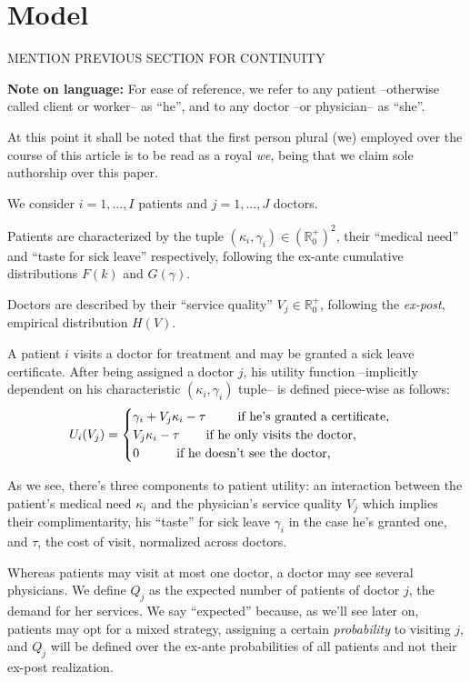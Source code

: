 \documentclass[../main.tex]{subfiles}
\begin{document}
\section{Model}

MENTION PREVIOUS SECTION FOR CONTINUITY

\textbf{Note on language:} For ease of reference, we refer to any patient --otherwise called client or worker-- as ``he'', and to any doctor --or physician-- as ``she''.

At this point it shall be noted that the first person plural (we) employed over the course of this article is to be read as a royal \textit{we}, being that we claim sole authorship over this paper.

We consider $i = 1, ..., I$ patients and $j = 1, ..., J$ doctors.

Patients are characterized by the tuple $(\kappa_i,\gamma_i) \in (\mathbb{R}_0^+)^2$, their ``medical need'' and ``taste for sick leave'' respectively, following the ex-ante cumulative distributions $F(k)$ and $G(\gamma)$.

Doctors are described by their ``service quality'' $V_j \in \mathbb{R}_0^+$, following the \textit{ex-post}, empirical distribution $H(V)$.

A patient $i$ visits a doctor for treatment and may be granted a sick leave certificate. After being assigned a doctor $j$, his utility function --implicitly dependent on his characteristic $(\kappa_i,\gamma_i)$ tuple-- is defined piece-wise as follows:
    \[
U_i(V_j) =\begin{cases}
\gamma_i + V_j \kappa_i - \tau \text{  \hspace{0.65cm} if he’s granted a certificate,} \\
V_j \kappa_i - \tau \text{  \hspace{0.5cm} if he only visits the doctor,} \\
0 \text{  \hspace{0.8cm} if he doesn't see the doctor,}
\end{cases}
\]

As we see, there's three components to patient utility: an interaction between the patient's medical need $\kappa_i$ and the physician's service quality $V_j$ which implies their complimentarity, his ``taste'' for sick leave $\gamma_i$ in the case he's granted one, and $\tau$, the cost of visit, normalized across doctors.

Whereas patients may visit at most one doctor, a doctor may see several physicians. We define $Q_j$ as the expected number of patients of doctor $j$, the demand for her services. We say ``expected'' because, as we'll see later on, patients may opt for a mixed strategy, assigning a certain \textit{probability} to visiting $j$, and $Q_j$ will be defined over the ex-ante probabilities of all patients and not their ex-post realization.
\end{document}
